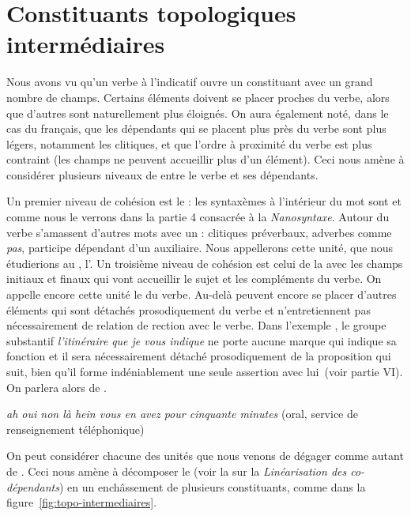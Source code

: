 \section{Constituants topologiques intermédiaires}\label{sec:3.5.34}

Nous avons vu qu’un verbe à l’indicatif ouvre un constituant avec un grand nombre de champs. Certains éléments doivent se placer proches du verbe, alors que d’autres sont naturellement plus éloignés. On aura également noté, dans le cas du français, que les dépendants qui se placent plus près du verbe sont plus légers, notamment les clitiques, et que l’ordre à proximité du verbe est plus contraint (les champs ne peuvent accueillir plus d’un élément). Ceci nous amène à considérer plusieurs niveaux de  entre le verbe et ses dépendants.

Un premier niveau de cohésion est le  : les syntaxèmes à l’intérieur du mot sont  et  comme nous le verrons dans la partie 4 consacrée à la \textit{Nanosyntaxe}. Autour du verbe s’amassent d’autres mots avec un : clitiques préverbaux, adverbes comme \textit{pas}, participe dépendant d’un auxiliaire. Nous appellerons cette unité, que nous étudierions au , l’. Un troisième niveau de cohésion est celui de la  avec les champs initiaux et finaux qui vont accueillir le sujet et les compléments du verbe. On appelle encore cette unité le  du verbe. Au-delà peuvent encore se placer d’autres éléments qui sont détachés prosodiquement du verbe et n’entretiennent pas nécessairement de relation de rection avec le verbe. Dans l’exemple , le groupe substantif \textit{l’itinéraire} \textit{que je vous indique} ne porte aucune marque qui indique sa fonction et il sera nécessairement détaché prosodiquement de la proposition qui suit, bien qu’il forme indéniablement une seule assertion avec lui~(voir partie VI). On parlera alors de .

\ea\label{ex:ratp}
{\itshape
 ah oui non là   {hein vous en avez pour cinquante minutes}} (oral, service de renseignement téléphonique)
\z

On peut considérer chacune des unités que nous venons de dégager comme autant de . Ceci nous amène à décomposer le  (voir la  sur la \textit{Linéarisation des co-dépendants}) en un enchâssement de plusieurs constituants, comme dans la figure~\ref{fig:topo-intermediaires}.

